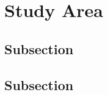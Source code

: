 \documentclass[../main.tex]{subfiles}
\begin{document}
\section{Study Area}
    \label{section:study-area}

\lipsum[1-3]

\autocite{tempor2023placeholder}

\subsection{Subsection}
    \label{subsection:2.1}

\lipsum[1-3]



\subsection{Subsection}
    \label{subsection:2.2}

    \autocite{veniam2024design}

\lipsum[1-3]

    
\end{document}
